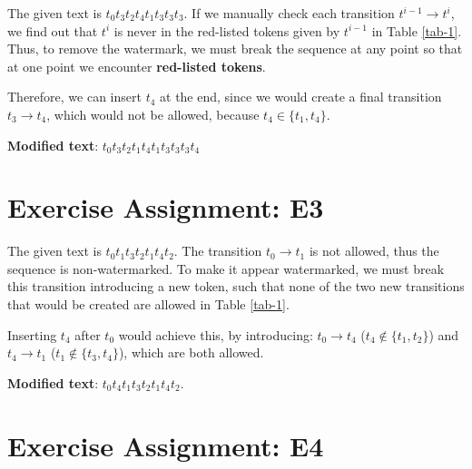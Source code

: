 \documentclass{article}
\begin{document}
The given text is \( t_0t_3t_2t_4t_1t_3t_3t_3 \). If we manually check each transition $t^{i-1} \to t^i$, we find out that $t^i$ is never in the red-listed tokens given by $t^{i-1}$ in Table \ref{tab-1}. Thus, to remove the watermark, we must break the sequence at any point so that at one point we encounter \textbf{red-listed tokens}.

Therefore, we can insert $t_4$ at the end, since we would create a final transition $t_3 \to t_4$, which would not be allowed, because $t_4 \in \{t_1, t_4\}$.

\textbf{Modified text}: \( t_0t_3t_2t_1t_4t_1t_3t_3t_3t_4 \)

\section{Exercise Assignment: E3}\label{sec:e3}
The given text is \( t_0t_1t_3t_2t_1t_4t_2 \). The transition $t_0 \to t_1$ is not allowed, thus the sequence is non-watermarked. To make it appear watermarked, we must break this transition introducing a new token, such that none of the two new transitions that would be created are allowed in Table \ref{tab-1}.

Inserting \( t_4 \) after \( t_0 \) would achieve this, by introducing: $t_0 \to t_4$ ($t_4 \notin \{t_1, t_2\}$) and $t_4 \to t_1$ ($t_1 \notin \{t_3, t_4\}$), which are both allowed.

\textbf{Modified text}: \( t_0t_4t_1t_3t_2t_1t_4t_2 \).

\section{Exercise Assignment: E4}\label{sec:e4}

\end{document}
